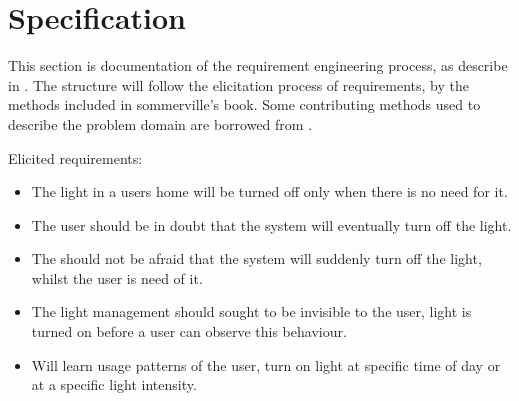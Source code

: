\section{Specification}

This section is documentation of the requirement engineering process, as describe in \cite{sommerville}. The structure will follow the elicitation process of requirements, by the methods included in sommerville's book. Some contributing methods used to describe the problem domain are borrowed from \cite{OOAD}.














Elicited requirements: %

\begin{itemize}
  \item The light in a users home will be turned off only when there is no need for it.
  \item The user should be in doubt that the system will eventually turn off the light.
  \item The should not be afraid that the system will suddenly turn off the light, whilst the user is need of it.
  \item The light management should sought to be invisible to the user, light is turned on before a user can observe this behaviour.
  \item Will learn usage patterns of the user, turn on light at specific time of day or at a specific light intensity.
\end{itemize}
